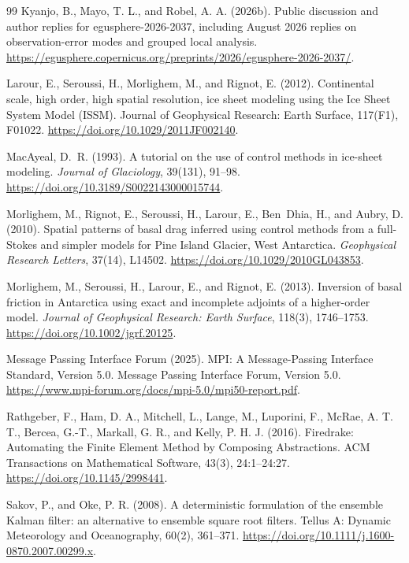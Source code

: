 \documentclass[11pt,a4paper]{article}
\begin{document}
\begin{thebibliography}{99}
 Kyanjo, B., Mayo, T. L., and Robel, A. A. (2026b). Public discussion and author replies for egusphere-2026-2037, including August 2026 replies on observation-error modes and grouped local analysis. \url{https://egusphere.copernicus.org/preprints/2026/egusphere-2026-2037/}.

 Larour, E., Seroussi, H., Morlighem, M., and Rignot, E. (2012). Continental scale, high order, high spatial resolution, ice sheet modeling using the Ice Sheet System Model (ISSM). Journal of Geophysical Research: Earth Surface, 117(F1), F01022. \url{https://doi.org/10.1029/2011JF002140}.

MacAyeal, D.~R. (1993).
A tutorial on the use of control methods in ice-sheet modeling.
\emph{Journal of Glaciology}, 39(131), 91--98.
\url{https://doi.org/10.3189/S0022143000015744}.

Morlighem, M., Rignot, E., Seroussi, H., Larour, E., Ben~Dhia, H., and Aubry, D. (2010).
Spatial patterns of basal drag inferred using control methods from a full-Stokes and simpler models for Pine Island Glacier, West Antarctica.
\emph{Geophysical Research Letters}, 37(14), L14502.
\url{https://doi.org/10.1029/2010GL043853}.

Morlighem, M., Seroussi, H., Larour, E., and Rignot, E. (2013).
Inversion of basal friction in Antarctica using exact and incomplete adjoints of a higher-order model.
\emph{Journal of Geophysical Research: Earth Surface}, 118(3), 1746--1753.
\url{https://doi.org/10.1002/jgrf.20125}.

 Message Passing Interface Forum (2025). MPI: A Message-Passing Interface Standard, Version 5.0. Message Passing Interface Forum, Version 5.0. \url{https://www.mpi-forum.org/docs/mpi-5.0/mpi50-report.pdf}.

 Rathgeber, F., Ham, D. A., Mitchell, L., Lange, M., Luporini, F., McRae, A. T. T., Bercea, G.-T., Markall, G. R., and Kelly, P. H. J. (2016). Firedrake: Automating the Finite Element Method by Composing Abstractions. ACM Transactions on Mathematical Software, 43(3), 24:1--24:27. \url{https://doi.org/10.1145/2998441}.

 Sakov, P., and Oke, P. R. (2008). A deterministic formulation of the ensemble Kalman filter: an alternative to ensemble square root filters. Tellus A: Dynamic Meteorology and Oceanography, 60(2), 361--371. \url{https://doi.org/10.1111/j.1600-0870.2007.00299.x}.


\end{thebibliography}
\end{document}
